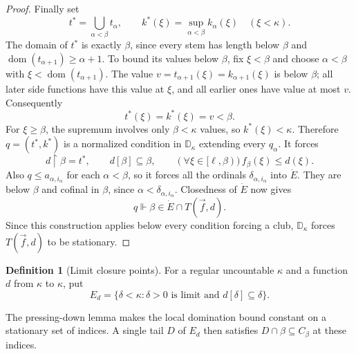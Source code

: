 \documentclass[10pt,a4paper]{amsart}
\theoremstyle{definition}
\newtheorem{definition}[theorem]{Definition}
\theoremstyle{remark}
\newcommand{\D}{\mathbb D}
\DeclareMathOperator{\dom}{dom}
\begin{document}
\begin{proof}
Finally set
\[
 t^*=\bigcup_{\alpha<\beta}t_\alpha,\qquad
 k^*(\xi)=\sup_{\alpha<\beta}k_\alpha(\xi)
                   \quad(\xi<\kappa).
\]
The domain of \(t^*\) is exactly \(\beta\), since every stem
has length below \(\beta\) and
\(\dom(t_{\alpha+1})\geq\alpha+1\). To bound its values below
\(\beta\), fix \(\xi<\beta\) and choose \(\alpha<\beta\) with
\(\xi<\dom(t_{\alpha+1})\). The value
\(v=t_{\alpha+1}(\xi)=k_{\alpha+1}(\xi)\) is below
\(\beta\); all later side functions have this value at \(\xi\),
and all earlier ones have value at most \(v\).
Consequently
\[
 t^*(\xi)=k^*(\xi)=v<\beta.
\]
For \(\xi\geq\beta\), the supremum involves only
\(\beta<\kappa\) values, so \(k^*(\xi)<\kappa\).
Therefore \(q=(t^*,k^*)\) is a normalized condition in
\(\D_\kappa\) extending every \(q_\alpha\). It forces
\[
 d\restriction\beta=t^*,\qquad d[\beta]\subseteq\beta,
 \qquad(\forall\xi\in[\ell,\beta))\,
                       f_\beta(\xi)\leq d(\xi).
\]
Also \(q\leq a_{\alpha,i_\alpha}\) for each \(\alpha<\beta\),
so it forces all the ordinals \(\delta_{\alpha,i_\alpha}\) into
\(\dot E\). They are below \(\beta\) and cofinal in
\(\beta\), since \(\alpha<\delta_{\alpha,i_\alpha}\).
Closedness of \(\dot E\) now gives
\[
 q\Vdash\beta\in\dot E\cap T(\vec f,d).
\]
Since this construction applies below every condition forcing a
club, \(\D_\kappa\) forces \(T(\vec f,d)\) to be stationary.
\end{proof}


\begin{definition}[Limit closure points]\label{def:closure-points}
For a regular uncountable \(\kappa\) and a function \(d\) from \(\kappa\) to \(\kappa\),
put
\[
 E_d=\{\delta<\kappa:\delta>0\text{ is limit and }
                              d[\delta]\subseteq\delta\}.
\]
\end{definition}

The pressing-down lemma makes the local domination bound constant
on a stationary set of indices. A single tail \(D\) of \(E_d\)
then satisfies \(D\cap\beta\subseteq C_\beta\) at these indices.
\end{document}
